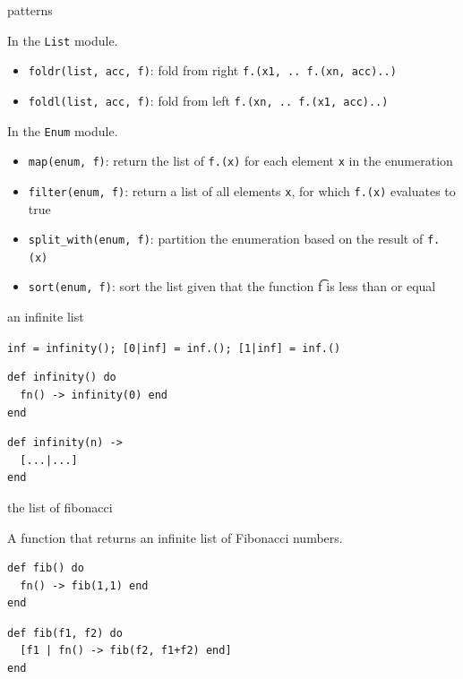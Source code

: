 \begin{frame}{patterns}

In the {\tt List} module. 

\begin{itemize}
\item {\tt foldr(list, acc, f)}: fold from right  {\tt f.(x1, .. f.(xn, acc)..) }
\item {\tt foldl(list, acc, f)}: fold from left  {\tt f.(xn, .. f.(x1, acc)..) }
\end{itemize}

\vspace{10pt}\pause
In the {\tt Enum} module. 
\begin{itemize}
\item {\tt map(enum, f)}: return the list of {\tt f.(x)} for each element {\tt x} in the enumeration
\pause 
\item {\tt filter(enum, f)}: return a list of all elements {\tt x}, for which {\tt f.(x)} evaluates to true
\pause
\item {\tt split_with(enum, f)}: partition the enumeration based on the result of  {\tt f.(x)}
\pause
\item {\tt sort(enum, f)}: sort the list given that the function {\t f} is less than or equal
\end{itemize}

\end{frame}


\begin{frame}[fragile]{an infinite list}

\pause\vspace{20pt}

\verb+inf = infinity()+\pause \verb+; [0|inf] = inf.()+\pause \verb+; [1|inf] = inf.()+

\pause
\begin{verbatim}
def infinity() do 
  fn() -> infinity(0) end 
end
\end{verbatim}
\pause
\begin{verbatim}
def infinity(n) -> 
  [...|...] 
end
\end{verbatim}

\end{frame}


\begin{frame}[fragile]{the list of fibonacci }

A function that returns an infinite list of Fibonacci numbers.

\pause\vspace{20pt}

\begin{verbatim}
def fib() do 
  fn() -> fib(1,1) end 
end
\end{verbatim}
\pause
\begin{verbatim}
def fib(f1, f2) do
  [f1 | fn() -> fib(f2, f1+f2) end]
end
\end{verbatim}

\end{frame}


